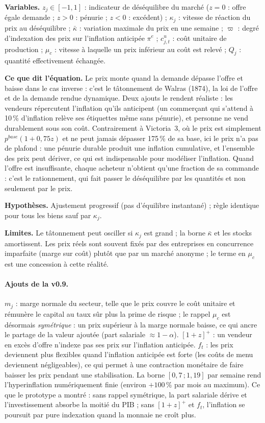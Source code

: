 \documentclass[11pt,a4paper]{article}
\newcommand{\variables}{\par\noindent\textbf{Variables.} }
\newcommand{\sens}{\par\noindent\textbf{Ce que dit l'équation.} }
\newcommand{\hyp}{\par\noindent\textbf{Hypothèses.} }
\newcommand{\limites}{\par\noindent\textbf{Limites.} }
\newcommand{\pos}[1]{{\left[#1\right]^{+}}}
\begin{document}
\begin{lecture}
\variables $z_j\in[-1,1]$ : indicateur de déséquilibre du marché ($z=0$ : offre égale demande ; $z>0$ : pénurie ; $z<0$ : excédent) ; $\kappa_j$ : vitesse de réaction du prix au déséquilibre ; $\bar\kappa$ : variation maximale du prix en une semaine ; $\varpi$ : degré d'indexation des prix sur l'inflation anticipée $\pi^e$ ; $c^u_{j,t}$ : coût unitaire de production ; $\mu_c$ : vitesse à laquelle un prix inférieur au coût est relevé ; $Q_j$ : quantité effectivement échangée.
\sens Le prix monte quand la demande dépasse l'offre et baisse dans le cas inverse : c'est le tâtonnement de Walras (1874), la loi de l'offre et de la demande rendue dynamique. Deux ajouts le rendent réaliste : les vendeurs répercutent l'inflation qu'ils anticipent (un commerçant qui s'attend à 10\,\% d'inflation relève ses étiquettes même sans pénurie), et personne ne vend durablement sous son coût. Contrairement à Victoria~3, où le prix est simplement $p^{base}(1+0{,}75z)$ et ne peut jamais dépasser 175\,\% de sa base, ici le prix n'a pas de plafond : une pénurie durable produit une inflation cumulative, et l'ensemble des prix peut dériver, ce qui est indispensable pour modéliser l'inflation. Quand l'offre est insuffisante, chaque acheteur n'obtient qu'une fraction de sa commande : c'est le rationnement, qui fait passer le déséquilibre par les quantités et non seulement par le prix.
\hyp Ajustement progressif (pas d'équilibre instantané) ; règle identique pour tous les biens sauf par $\kappa_j$.
\limites Le tâtonnement peut osciller si $\kappa_j$ est grand ; la borne $\bar\kappa$ et les stocks amortissent. Les prix réels sont souvent fixés par des entreprises en concurrence imparfaite (marge sur coût) plutôt que par un marché anonyme ; le terme en $\mu_c$ est une concession à cette réalité.
\paragraph{Ajouts de la v0.9.} $m_j$ : marge normale du secteur, telle que le prix couvre le coût unitaire et rémunère le capital au taux sûr plus la prime de risque ; le rappel $\mu_c$ est désormais \emph{symétrique} : un prix supérieur à la marge normale baisse, ce qui ancre le partage de la valeur ajoutée (part salariale $\approx1-\alpha$). $\pos{1+z}$ : un vendeur en excès d'offre n'indexe pas ses prix sur l'inflation anticipée. $f_t$ : les prix deviennent plus flexibles quand l'inflation anticipée est forte (les coûts de menu deviennent négligeables), ce qui permet à une contraction monétaire de faire baisser les prix pendant une stabilisation. La borne $[0{,}7\,;1{,}19]$ par semaine rend l'hyperinflation numériquement finie (environ $+100\,\%$ par mois au maximum). Ce que le prototype a montré : sans rappel symétrique, la part salariale dérive et l'investissement absorbe la moitié du PIB ; sans $\pos{1+z}$ et $f_t$, l'inflation se poursuit par pure indexation quand la monnaie ne croît plus.
\end{lecture}
\end{document}

